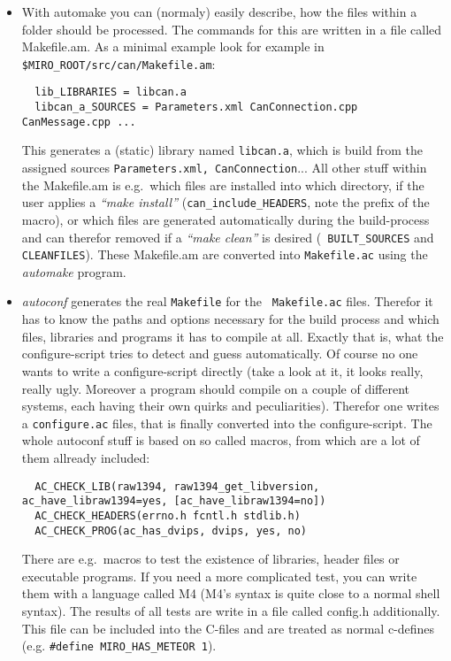 \begin{itemize}
\item With automake you can (normaly) easily describe, how the files
within a folder should be processed. The commands for this are written
in a file called Makefile.am. As a minimal example look for example in
{\tt \$MIRO\_ROOT/\-src/\-can/\-Makefile.am}:

\begin{verbatim}
  lib_LIBRARIES = libcan.a
  libcan_a_SOURCES = Parameters.xml CanConnection.cpp CanMessage.cpp ...
\end{verbatim}

This generates a (static) library named {\tt libcan.a}, which is build
from the assigned sources {\tt Parameters.xml, CanConnection}...  All
other stuff within the Makefile.am is e.g.\ which files are installed
into which directory, if the user applies a {\em "`make install"'\/}
({\tt can\_include\_HEADERS}, note the prefix of the macro), or which
files are generated automatically during the build-process and can
therefor removed if a {\em "`make clean"'\/} is desired ({\tt
BUILT\_SOURCES} and {\tt CLEANFILES}). These Makefile.am are converted
into {\tt Makefile.ac} using the {\em automake\/} program.

\item {\em autoconf\/} generates the real {\tt Makefile} for the {\tt
Makefile.ac} files. Therefor it has to know the paths and options
necessary for the build process and which files, libraries and
programs it has to compile at all. Exactly that is, what the
configure-script tries to detect and guess automatically. Of course no
one wants to write a configure-script directly (take a look at it, it
looks really, really ugly. Moreover a program should compile on a
couple of different systems, each having their own quirks and
peculiarities). Therefor one writes a {\tt configure.ac} files, that
is finally converted into the configure-script. The whole autoconf
stuff is based on so called macros, from which are a lot of them
allready included:

\begin{verbatim}
  AC_CHECK_LIB(raw1394, raw1394_get_libversion, ac_have_libraw1394=yes, [ac_have_libraw1394=no])
  AC_CHECK_HEADERS(errno.h fcntl.h stdlib.h)
  AC_CHECK_PROG(ac_has_dvips, dvips, yes, no)
\end{verbatim}

There are e.g.\ macros to test the existence of libraries, header files
or executable programs. If you need a more complicated test, you can
write them with a language called M4 (M4's syntax is quite close to a
normal shell syntax). The results of all tests are write in a file
called config.h additionally. This file can be included into the
C-files and are treated as normal c-defines (e.g. {\tt \#define
MIRO\_HAS\_METEOR 1}).
\end{itemize}


